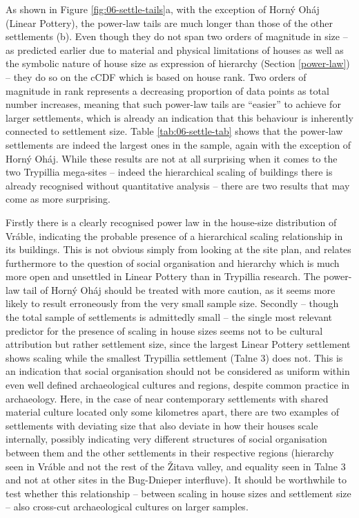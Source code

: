 \documentclass[
  12pt,
  a4paper, twoside]{book}
\begin{document}
As shown in Figure \ref{fig:06-settle-tails}a, with the exception of Horný Oháj (Linear Pottery), the power-law tails are much longer than those of the other settlements (b). Even though they do not span two orders of magnitude in size -- as predicted earlier due to material and physical limitations of houses as well as the symbolic nature of house size as expression of hierarchy (Section \ref{power-law}) -- they do so on the cCDF which is based on house rank. Two orders of magnitude in rank represents a decreasing proportion of data points as total number increases, meaning that such power-law tails are ``easier'' to achieve for larger settlements, which is already an indication that this behaviour is inherently connected to settlement size. Table \ref{tab:06-settle-tab} shows that the power-law settlements are indeed the largest ones in the sample, again with the exception of Horný Oháj. While these results are not at all surprising when it comes to the two Trypillia mega-sites -- indeed the hierarchical scaling of buildings there is already recognised without quantitative analysis -- there are two results that may come as more surprising.

Firstly there is a clearly recognised power law in the house-size distribution of Vráble, indicating the probable presence of a hierarchical scaling relationship in its buildings. This is not obvious simply from looking at the site plan, and relates furthermore to the question of social organisation and hierarchy which is much more open and unsettled in Linear Pottery than in Trypillia research. The power-law tail of Horný Oháj should be treated with more caution, as it seems more likely to result erroneously from the very small sample size. Secondly -- though the total sample of settlements is admittedly small -- the single most relevant predictor for the presence of scaling in house sizes seems not to be cultural attribution but rather settlement size, since the largest Linear Pottery settlement shows scaling while the smallest Trypillia settlement (Talne 3) does not. This is an indication that social organisation should not be considered as uniform within even well defined archaeological cultures and regions, despite common practice in archaeology. Here, in the case of near contemporary settlements with shared material culture located only some kilometres apart, there are two examples of settlements with deviating size that also deviate in how their houses scale internally, possibly indicating very different structures of social organisation between them and the other settlements in their respective regions (hierarchy seen in Vráble and not the rest of the Žitava valley, and equality seen in Talne 3 and not at other sites in the Bug-Dnieper interfluve). It should be worthwhile to test whether this relationship -- between scaling in house sizes and settlement size -- also cross-cut archaeological cultures on larger samples.
\end{document}
